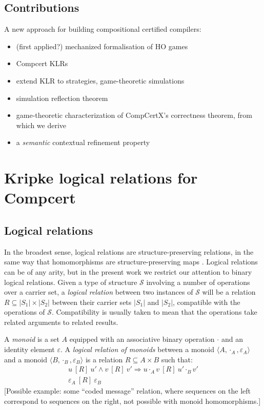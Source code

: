 \documentclass[acmsmall,anonymous]{acmart}
\newcommand{\ifr}[1]{\ [{#1}]\ }
\begin{document}
\subsection{Contributions}

A new approach for building compositional certified compilers:
\begin{itemize}
\item (first applied?) mechanized formalisation of HO games
\item Compcert KLRs
\item extend KLR to strategies, game-theoretic simulations
\item simulation reflection theorem
\item game-theoretic characterization of CompCertX's correctness theorem, from which we derive
\item a \emph{semantic} contextual refinement property
\end{itemize}


\newpage
\section{Kripke logical relations for Compcert} %


\subsection{Logical relations} %

In the broadest sense,
logical relations are structure-preserving relations,
in the same way that homomorphisms are structure-preserving maps
\citep{lrp}.
Logical relations can be of any arity,
but in the present work
we restrict our attention to
binary logical relations.
Given a type of structure $\mathcal{S}$
involving a number of operations over a carrier set,
a \emph{logical relation}
between two instances of $\mathcal{S}$
will be a relation $R \subseteq |S_1| \times |S_2|$
between their carrier sets $|S_1|$ and $|S_2|$,
compatible with the operations of $\mathcal{S}$.
Compatibility is usually taken to mean that
the operations take related arguments to related results.

\begin{example}
A \emph{monoid} is a set $A$ equipped with
an associative binary operation $\cdot$ and
an identity element $\varepsilon$.
A \emph{logical relation of monoids} between
a monoid $\langle A, \cdot_A, \varepsilon_A \rangle$ and
a monoid $\langle B, \cdot_B, \varepsilon_B \rangle$
is a relation $R \subseteq A \times B$
such that:
\begin{gather*}
u \ifr{R} u' \wedge v \ifr{R} v' \Rightarrow u \cdot_A v \ifr{R} u' \cdot_B v' \\
\varepsilon_A \ifr{R} \varepsilon_B
\end{gather*}
[Possible example: some ``coded message'' relation,
where sequences on the left correspond to sequences on the right,
not possible with monoid homomorphisms.]
\end{example}
\end{document}
